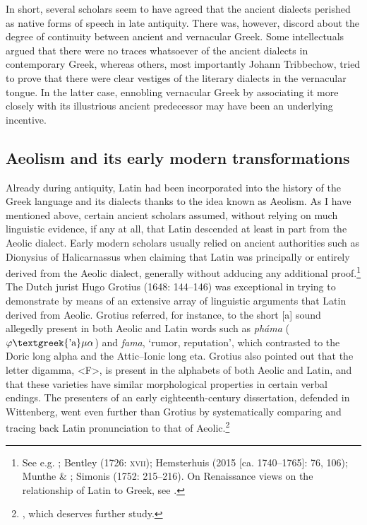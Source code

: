 In short, several scholars seem to have agreed that the ancient dialects perished as native forms of speech in late antiquity. There was, however, discord about the degree of continuity between ancient and vernacular Greek. Some intellectuals argued that there were no traces whatsoever of the ancient dialects in contemporary Greek, whereas others, most importantly Johann Tribbechow, tried to prove that there were clear vestiges of the literary dialects in the vernacular tongue. In the latter case, ennobling vernacular Greek by associating it more closely with its illustrious ancient predecessor may have been an underlying incentive.

\subsection{Aeolism and its early modern transformations}
\hypertarget{Toc19704840}{}
Already during antiquity, Latin had been incorporated into the history of the Greek language and its dialects thanks to the idea known as Aeolism. As I have mentioned above, certain ancient scholars assumed, without relying on much linguistic evidence, if any at all, that Latin descended at least in part from the Aeolic dialect. Early modern scholars usually relied on ancient authorities such as Dionysius of Halicarnassus when claiming that Latin was principally or entirely derived from the Aeolic dialect, generally without adducing any additional proof.\footnote{See e.g. \citet[84]{Crinesius1629}; Bentley (1726: \textsc{xvii}); Hemsterhuis (2015 [ca. 1740–1765]: 76, 106); Munthe \& \citet[30]{Heiberg1748}; Simonis (1752: 215–216). On Renaissance views on the relationship of Latin to Greek, see \citet{Tavoni1986}.} The Dutch jurist Hugo Grotius (1648: 144–146) was exceptional in trying to demonstrate by means of an extensive array of linguistic arguments that Latin derived from Aeolic. Grotius referred, for instance, to the short [a] sound allegedly present in both Aeolic and Latin words such as \textit{pháma} ($\varphi \text{\textgreek{'a}}\mu \alpha $) and \textit{fama}, ‘rumor, reputation’, which contrasted to the Doric long alpha and the Attic–Ionic long eta. Grotius also pointed out that the letter digamma, <F>, is present in the alphabets of both Aeolic and Latin, and that these varieties have similar morphological properties in certain verbal endings. The presenters of an early eighteenth-century dissertation, defended in Wittenberg, went even further than Grotius by systematically comparing and tracing back Latin pronunciation to that of Aeolic.\footnote{\citet{ThryllitschBrunner1709}, which deserves further study.}


